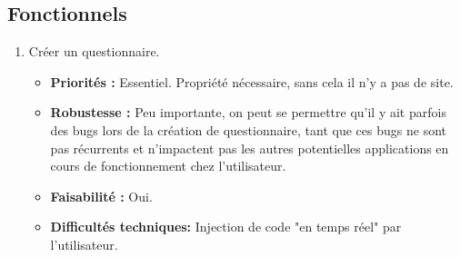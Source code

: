 \documentclass{article}
\begin{document}
\subsection{Fonctionnels}
\begin{enumerate}[noitemsep]
\item Créer un questionnaire.
\begin{itemize}[noitemsep]
\item \textbf{Priorités : }Essentiel. Propriété nécessaire, sans cela il n'y a pas de site.
\item \textbf{Robustesse : }Peu importante, on peut se permettre qu'il y ait parfois des bugs lors de la création de questionnaire, tant que ces bugs ne sont pas récurrents et n'impactent pas les autres potentielles applications en cours de fonctionnement chez l'utilisateur.
\item \textbf{Faisabilité : }Oui.
\item \textbf{Difficultés techniques: } Injection de code "en temps réel" par l'utilisateur.
\end{itemize}

\end{enumerate}
\end{document}
